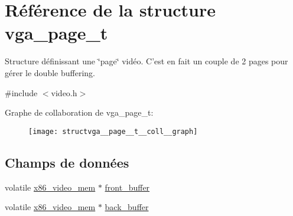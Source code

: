 \hypertarget{structvga__page__t}{\section{\-Référence de la structure vga\-\_\-page\-\_\-t}
\label{structvga__page__t}
}


\-Structure définissant une \char`\"{}page\char`\"{} vidéo. \-C'est en fait un couple de 2 pages pour gérer le double buffering.  




{\ttfamily \#include $<$video.\-h$>$}



\-Graphe de collaboration de vga\-\_\-page\-\_\-t\-:\nopagebreak
\begin{figure}[H]
\begin{center}
\leavevmode
\texttt{[image: structvga\_\_page\_\_t\_\_coll\_\_graph]}
\end{center}
\end{figure}
\subsection*{\-Champs de données}
\begin{DoxyCompactItemize}
\item 
volatile \hyperlink{structx86__video__mem}{x86\-\_\-video\-\_\-mem} $\ast$ \hyperlink{structvga__page__t_a8f820f9799bc5f9886e9f74c09e24841}{front\-\_\-buffer}
\item 
volatile \hyperlink{structx86__video__mem}{x86\-\_\-video\-\_\-mem} $\ast$ \hyperlink{structvga__page__t_aaad0350a467498fb34a0b8b1586ac76c}{back\-\_\-buffer}
\end{DoxyCompactItemize}


